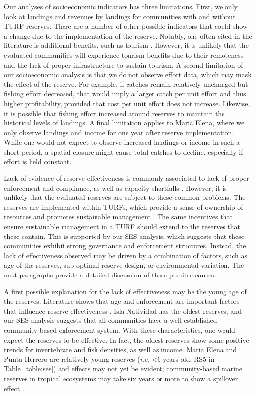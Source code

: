 \documentclass[10pt,letterpaper]{article}
\begin{document}
Our analyses of socioeconomic indicators has three limitations. First, we only look at landings and revenues by landings for communities with and without TURF-reserves. There are a number of other possible indicators that could show a change due to the implementation of the reserve. Notably, one often cited in the literature is additional benefits, such as tourism \cite{viana_2017}. However, it is unlikely that the evaluated communities will experience tourism benefits due to their remoteness and the lack of proper infrastructure to sustain tourism. A second limitation of our socioeconomic analysis is that we do not observe effort data, which may mask the effect of the reserve. For example, if catches remain relatively unchanged but fishing effort decreased, that would imply a larger catch per unit effort and thus higher profitability, provided that cost per unit effort does not increase. Likewise, it is possible that fishing effort increased around reserves to maintain the historical levels of landings. A final limitation applies to Maria Elena, where we only observe landings and income for one year after reserve implementation. While one would not expect to observe increased landings or income in such a short period, a spatial closure might cause total catches to decline, especially if effort is held constant.

Lack of evidence of reserve effectiveness is commonly associated to lack of proper enforcement and compliance, as well as capacity shortfalls \cite{edgar_2014-UO,difranco_2016-Xw,gill_2017}. However, it is unlikely that the evaluated reserves are subject to these common problems. The reserves are implemented within TURFs, which provide a sense of ownership of resources and promotes sustainable management \cite{mccay_2017}. The same incentives that ensure sustainable management in a TURF should extend to the reserves that these contain. This is supported by our SES analysis, which suggests that these communities exhibit strong governance and enforcement structures. Instead, the lack of effectiveness observed may be driven by a combination of factors, such as age of the reserves, sub-optimal reserve design, or environmental variation. The next paragraphs provide a detailed discussion of these possible causes.

A first possible explanation for the lack of effectiveness may be the young age of the reserves. Literature shows that age and enforcement are important factors that influence reserve effectiveness \cite{edgar_2014-UO,babcock_2010}. Isla Natividad has the oldest reserves, and our SES analysis suggests that all communities have a well-established community-based enforcement system. With these characteristics, one would expect the reserves to be effective. In fact, the oldest reserves show some positive trends for invertebrate and fish densities, as well as income. Maria Elena and Punta Herrero are relatively young reserves (\emph{i.e.} \textless 6 years old; RS5 in Table~\ref{table:ses}) and effects may not yet be evident; community-based marine reserves in tropical ecosystems may take six years or more to show a spillover effect \cite{dasilva_2015-zX}. 
\end{document}
